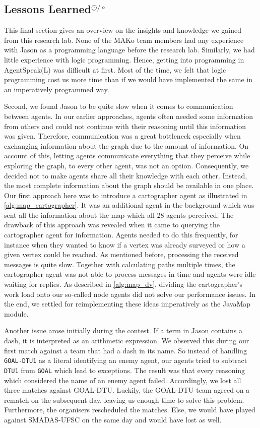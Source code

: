 \subsection[Lessons Learned]{Lessons Learned$^{\odot/\circ}$}\label{con:learned}
This final section gives an overview on the insights and knowledge we gained from this research lab.
None of the MAKo team members had any experience with Jason as a programming language before the research lab.
Similarly, we had little experience with logic programming.
Hence, getting into programming in AgentSpeak(L) was difficult at first.
Most of the time, we felt that logic programming cost us more time than if we would have implemented the same in an imperatively programmed way.

Second, we found Jason to be quite slow when it comes to communication between agents.
In our earlier approaches, agents often needed some information from others and could not continue with their reasoning until this information was given.
Therefore, communication was a great bottleneck especially when exchanging information about the graph due to the amount of information.
On account of this, letting agents communicate everything that they perceive while exploring the graph, to every other agent, was not an option.
Consequently, we decided not to make agents share all their knowledge with each other.
Instead, the most complete information about the graph should be available in one place.
Our first approach here was to introduce a cartographer agent as illustrated in \autoref{alg:map_cartographer}.
It was an additional agent in the background which was sent all the information about the map which all 28 agents perceived.
The drawback of this approach was revealed when it came to querying the cartographer agent for information.
Agents needed to do this frequently, for instance when they wanted to know if a vertex was already surveyed or how a given vertex could be reached.
As mentioned before, processing the received messages is quite slow.
Together with calculating paths multiple times, the cartographer agent was not able to process messages in time and agents were idle waiting for replies.
As described in \autoref{alg:map_dv}, dividing the cartographer's work load onto our so-called node agents did not solve our performance issues.
In the end, we settled for reimplementing these ideas imperatively as the JavaMap module.

Another issue arose initially during the contest.
If a term in Jason contains a dash, it is interpreted as an arithmetic expression.
We observed this during our first match against a team that had a dash in its name.
So instead of handling \texttt{GOAL-DTU1} as a literal identifying an enemy agent, our agents tried to subtract \texttt{DTU1} from \texttt{GOAL} which lead to exceptions.
The result was that every reasoning which considered the name of an enemy agent failed.
Accordingly, we lost all three matches against GOAL-DTU.
Luckily, the GOAL-DTU team agreed on a rematch on the subsequent day, leaving us enough time to solve this problem.
Furthermore, the organisers rescheduled the matches.
Else, we would have played against SMADAS-UFSC on the same day and would have lost as well.

